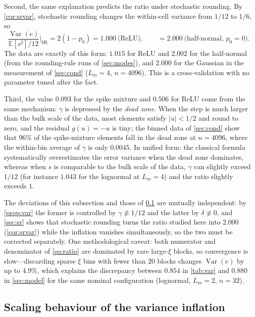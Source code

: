 \documentclass[twocolumn,review,hidelinks,oneeqnum,onetabnum,onefignum,onethmnum]{siamart251216}
\begin{document}
Second, the same explanation predicts the ratio under stochastic rounding. By
\cref{cor:srvar}, stochastic rounding changes the within-cell variance from
$1/12$ to $1/6$, so
\begin{equation}
\frac{\operatorname{Var}(e)}{\mathbb{E}[s^2]/12}\Big|_{\text{SR}}
=2(1-p_0)=1.000\ \text{(ReLU)},\qquad =2.000\ \text{(half-normal, }p_0=0\text{)} .
\end{equation}
The data are exactly of this form: $1.015$ for ReLU and $2.002$ for the
half-normal (from the rounding-rule runs of \cref{sec:modes}), and $2.000$ for the
Gaussian in the measurement
of \cref{sec:cond} ($L_m=4$, $n=4096$). This is a cross-validation with no
parameter tuned after the fact.

Third, the value $0.093$ for the spike mixture and $0.506$ for ReLU come from the
same mechanism: $\gamma$ is depressed by the \emph{dead zone}. When the step is
much larger than the bulk scale of the data, most elements satisfy $|u|<1/2$ and
round to zero, and the residual $g(u)=-u$ is tiny; the binned data of
\cref{sec:cond} show that $96\%$ of the spike-mixture elements fall in the dead
zone at $n=4096$, where the within-bin average of $\gamma$ is only $0.0045$. In
unified form: the classical formula systematically overestimates the error
variance when the dead zone dominates, whereas when $s$ is comparable to the bulk
scale of the data, $\gamma$ can slightly exceed $1/12$ (for instance $1.043$ for
the lognormal at $L_m=4$) and the ratio slightly exceeds $1$.

The deviations of this subsection and those of \cref{sec:infl} are mutually
independent: by \cref{prop:var} the former is controlled by
$\gamma\not\equiv1/12$ and the latter by $\delta\not\equiv0$, and
\cref{sec:sr} shows that stochastic rounding turns the ratio studied here into
$2.000$ (\cref{cor:srvar}) while the inflation vanishes simultaneously, so the
two must be corrected separately. One methodological caveat: both numerator and
denominator of \cref{eq:ratio} are dominated by rare large-$\xi$ blocks, so
convergence is slow---discarding sparse $\xi$ bins with fewer than $20$ blocks
changes $\operatorname{Var}(e)$ by up to $4.9\%$, which explains the discrepancy
between $0.854$ in \cref{tab:var} and $0.880$ in \cref{sec:model} for the same
nominal configuration (lognormal, $L_m=2$, $n=32$).

\subsection{Scaling behaviour of the variance inflation}
\label{sec:infl}
\end{document}

